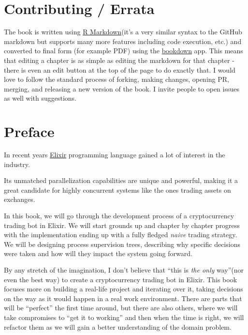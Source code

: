 \documentclass[
]{book}
\begin{document}
\hypertarget{contributing-errata}{%
\section*{Contributing / Errata}\label{contributing-errata}}

The book is written using \href{http://rmarkdown.rstudio.com/}{R Markdown}(it's a very similar syntax to the GitHub markdown but supports many more features including code execution, etc.) and converted to final form (for example PDF) using the \href{https://www.bookdown.org/}{bookdown} app. This means that editing a chapter is as simple as editing the markdown for that chapter - there is even an edit button at the top of the page to do exactly that. I would love to follow the standard process of forking, making changes, opening PR, merging, and releasing a new version of the book. I invite people to open issues as well with suggestions.

\hypertarget{preface}{%
\section*{Preface}\label{preface}}

In recent years \href{https://elixir-lang.org/}{Elixir} programming language gained a lot of interest in the industry.

Its unmatched parallelization capabilities are unique and powerful, making it a great candidate for highly concurrent systems like the ones trading assets on exchanges.

In this book, we will go through the development process of a cryptocurrency trading bot in Elixir. We will start grounds up and chapter by chapter progress with the implementation ending up with a fully fledged \emph{naive} trading strategy. We will be designing process supervision trees, describing why specific decisions were taken and how will they impact the system going forward.

By any stretch of the imagination, I don't believe that ``this is \emph{the only} way''(nor even the best way) to create a cryptocurrency trading bot in Elixir. This book focuses more on building a real-life project and iterating over it, taking decisions on the way as it would happen in a real work environment. There are parts that will be ``perfect'' the first time around, but there are also others, where we will take compromises to ``get it to working'' and then when the time is right, we will refactor them as we will gain a better understanding of the domain problem.
\end{document}
